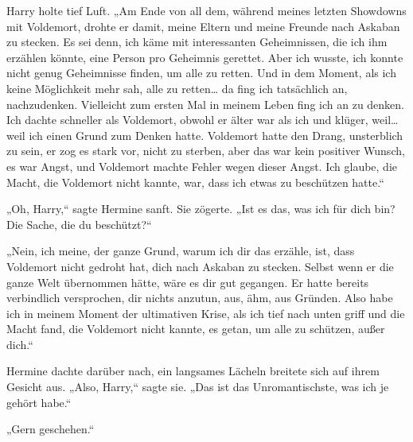 Harry holte tief Luft.
„Am Ende von all dem, während meines letzten Showdowns mit Voldemort, drohte er damit, meine Eltern und meine Freunde nach Askaban zu stecken. Es sei denn, ich käme mit interessanten Geheimnissen, die ich ihm erzählen könnte, eine Person pro Geheimnis gerettet. Aber ich wusste, ich konnte nicht genug Geheimnisse finden, um alle zu retten. Und in dem Moment, als ich keine Möglichkeit mehr sah, alle zu retten… da fing ich tatsächlich an, nachzudenken. Vielleicht zum ersten Mal in meinem Leben fing ich an zu denken. Ich dachte schneller als Voldemort, obwohl er älter war als ich und klüger, weil… weil ich einen Grund zum Denken hatte. Voldemort hatte den Drang, unsterblich zu sein, er zog es stark vor, nicht zu sterben, aber das war kein positiver Wunsch, es war Angst, und Voldemort machte Fehler wegen dieser Angst. Ich glaube, die Macht, die Voldemort nicht kannte, war, dass ich etwas zu beschützen hatte.“

„Oh, Harry,“ sagte Hermine sanft.
Sie zögerte.
„Ist es das, was ich für dich bin? Die Sache, die du beschützt?“

„Nein, ich meine, der ganze Grund, warum ich dir das erzähle, ist, dass Voldemort nicht gedroht hat, dich nach Askaban zu stecken. Selbst wenn er die ganze Welt übernommen hätte, wäre es dir gut gegangen. Er hatte bereits verbindlich versprochen, dir nichts anzutun, aus, ähm, aus Gründen. Also habe ich in meinem Moment der ultimativen Krise, als ich tief nach unten griff und die Macht fand, die Voldemort nicht kannte, es getan, um alle zu schützen, außer dich.“

Hermine dachte darüber nach, ein langsames Lächeln breitete sich auf ihrem Gesicht aus. „Also, Harry,“ sagte sie. „Das ist das Unromantischste, was ich je gehört habe.“

„Gern geschehen.“


